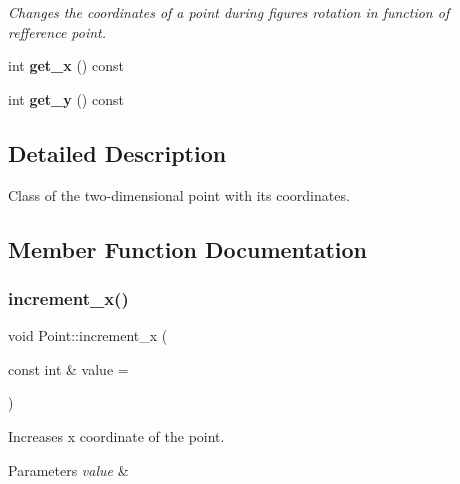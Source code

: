 \begin{DoxyCompactItemize}
\begin{DoxyCompactList}\small\item\em Changes the coordinates of a point during figure\textquotesingle{}s rotation in function of refference point. \end{DoxyCompactList}\item 
\mbox{\label{classPoint_abb31332f93346e8a0a7bb272365488ee}} 
int {\bfseries get\+\_\+x} () const
\item 
\mbox{\label{classPoint_a9be942f6453722dce81e12d4c3b64ca1}} 
int {\bfseries get\+\_\+y} () const
\end{DoxyCompactItemize}


\subsection{Detailed Description}
Class of the two-\/dimensional point with its coordinates. 

\subsection{Member Function Documentation}
\mbox{\label{classPoint_a0fdf91327c2be8c48dd07dfe4106e890}} 
\subsubsection{\texorpdfstring{increment\+\_\+x()}{increment\_x()}}
{\footnotesize\ttfamily void Point\+::increment\+\_\+x (\begin{DoxyParamCaption}\item[{const int \&}]{value = {} }\end{DoxyParamCaption})}



Increases x coordinate of the point. 


\begin{DoxyParams}{Parameters}
{\em value} & \\
\hline
\end{DoxyParams}
\mbox{\label{classPoint_aa72c0088d3484f7947f2ceaf51f403b3}} 

